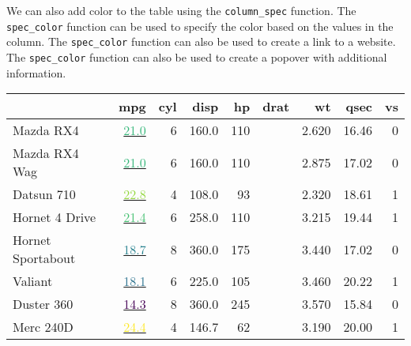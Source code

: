 \documentclass[
  letterpaper,
  DIV=11,
  numbers=noendperiod]{scrartcl}
\begin{document}
We can also add color to the table using the \texttt{column\_spec}
function. The \texttt{spec\_color} function can be used to specify the
color based on the values in the column. The \texttt{spec\_color}
function can also be used to create a link to a website. The
\texttt{spec\_color} function can also be used to create a popover with
additional information.

\begin{table}
\centering
\begin{tabular}[t]{l|>{}r|r|r|r|>{}r|r|r|r}
\hline
  & mpg & cyl & disp & hp & drat & wt & qsec & vs\\
\hline
Mazda RX4 & \href{https://haozhu233.github.io/kableExtra/}{\textcolor[HTML]{34B679}{21.0}} & 6 & 160.0 & 110 & \cellcolor[HTML]{43BF71}{\textcolor{white}{3.90}} & 2.620 & 16.46 & 0\\
\hline
Mazda RX4 Wag & \href{https://haozhu233.github.io/kableExtra/}{\textcolor[HTML]{34B679}{21.0}} & 6 & 160.0 & 110 & \cellcolor[HTML]{43BF71}{\textcolor{white}{3.90}} & 2.875 & 17.02 & 0\\
\hline
Datsun 710 & \href{https://haozhu233.github.io/kableExtra/}{\textcolor[HTML]{95D840}{22.8}} & 4 & 108.0 & 93 & \cellcolor[HTML]{37B878}{\textcolor{white}{3.85}} & 2.320 & 18.61 & 1\\
\hline
Hornet 4 Drive & \href{https://haozhu233.github.io/kableExtra/}{\textcolor[HTML]{44BF70}{21.4}} & 6 & 258.0 & 110 & \cellcolor[HTML]{414387}{\textcolor{white}{3.08}} & 3.215 & 19.44 & 1\\
\hline
Hornet Sportabout & \href{https://haozhu233.github.io/kableExtra/}{\textcolor[HTML]{26818E}{18.7}} & 8 & 360.0 & 175 & \cellcolor[HTML]{3C4F8A}{\textcolor{white}{3.15}} & 3.440 & 17.02 & 0\\
\hline
Valiant & \href{https://haozhu233.github.io/kableExtra/}{\textcolor[HTML]{2C728E}{18.1}} & 6 & 225.0 & 105 & \cellcolor[HTML]{440154}{\textcolor{white}{2.76}} & 3.460 & 20.22 & 1\\
\hline
Duster 360 & \href{https://haozhu233.github.io/kableExtra/}{\textcolor[HTML]{440154}{14.3}} & 8 & 360.0 & 245 & \cellcolor[HTML]{375A8C}{\textcolor{white}{3.21}} & 3.570 & 15.84 & 0\\
\hline
Merc 240D & \href{https://haozhu233.github.io/kableExtra/}{\textcolor[HTML]{FDE725}{24.4}} & 4 & 146.7 & 62 & \cellcolor[HTML]{1FA187}{\textcolor{white}{3.69}} & 3.190 & 20.00 & 1\\
\hline
\end{tabular}
\end{table}
\end{document}
